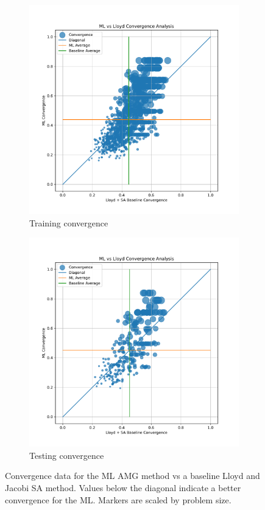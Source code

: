 \documentclass{article}
\begin{document}
\begin{figure}[h]
  \centering
  \begin{subfigure}[t]{0.49\textwidth}
    \centering
    \includegraphics[width=\textwidth]{train_convergence.pdf}
    \caption{Training convergence}
  \end{subfigure}
  \begin{subfigure}[t]{0.49\textwidth}
    \centering
    \includegraphics[width=\textwidth]{test_convergence.pdf}
    \caption{Testing convergence}
  \end{subfigure}
  \caption{Convergence data for the ML AMG method vs a baseline Lloyd and Jacobi SA method.  Values below the diagonal indicate a better convergence for the ML.  Markers are scaled by problem size.}
  \label{fig:conv}
\end{figure}
\end{document}
